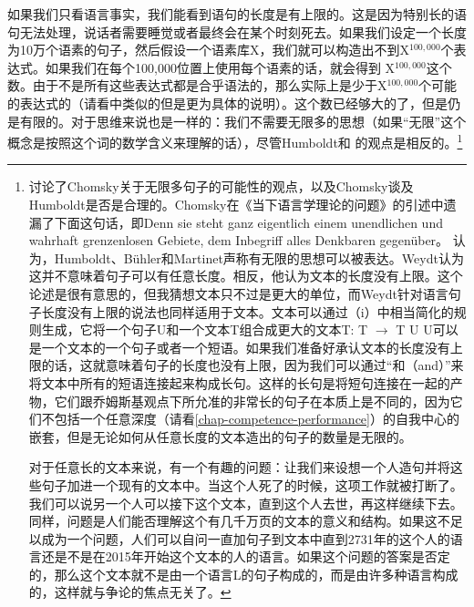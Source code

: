 \noindent
如果我们只看语言事实，我们能看到语句的长度是有上限的。这是因为特别长的语句无法处理，说话者需要睡觉或者最终会在某个时刻死去。如果我们设定一个长度为10万个语素的句子，然后假设一个语素库X，我们就可以构造出不到X$^{100,000}$个表达式。如果我们在每个100,000位置上使用每个语素的话，就会得到 X$^{100,000}$这个数。由于不是所有这些表达式都是合乎语法的，那么实际上是少于X$^{100,000}$个可能的表达式的（请看\citealp{Weydt72a}中类似的但是更为具体的说明）。这个数已经够大的了，但是仍是有限的。对于思维来说也是一样的：我们不需要无限多的思想（如果“无限”这个概念是按照这个词的数学含义来理解的话），尽管Humboldt和 \citet[]{Chomsky2008a}的观点是相反的。\footnote{%
 \citet{Weydt72a}讨论了Chomsky关于无限多句子的可能性的观点，以及Chomsky谈及Humboldt是否是合理的。Chomsky在《当下语言学理论的问题》\citep[]{Chomsky70b-ut}的引述中遗漏了下面这句话，即Denn sie steht ganz eigentlich einem unendlichen und
    wahrhaft grenzenlosen Gebiete, dem Inbegriff alles Denkbaren gegenüber。 \citet[]{Weydt72a}认为，Humboldt、Bühler和Martinet声称有无限的思想可以被表达。Weydt认为这并不意味着句子可以有任意长度。相反，他认为文本的长度没有上限。这个论述是很有意思的，但我猜想文本只不过是更大的单位，而Weydt针对语言句子长度没有上限的说法也同样适用于文本。文本可以通过（i）中相当简化的规则生成，它将一个句子U和一个文本T组合成更大的文本T:
  \ea
  T $\to$ T U
  \z
U可以是一个文本的一个句子或者一个短语。如果我们准备好承认文本的长度没有上限的话，这就意味着句子的长度也没有上限，因为我们可以通过“和（and）”来将文本中所有的短语连接起来构成长句。这样的长句是将短句连接在一起的产物，它们跟乔姆斯基观点下所允准的非常长的句子在本质上是不同的，因为它们不包括一个任意深度（请看\ref{chap-competence-performance}）的自我中心的嵌套，但是无论如何从任意长度的文本造出的句子的数量是无限的。

对于任意长的文本来说，有一个有趣的问题：让我们来设想一个人造句并将这些句子加进一个现有的文本中。当这个人死了的时候，这项工作就被打断了。我们可以说另一个人可以接下这个文本，直到这个人去世，再这样继续下去。同样，问题是人们能否理解这个有几千万页的文本的意义和结构。如果这不足以成为一个问题，人们可以自问一直加句子到文本中直到2731年的这个人的语言还是不是在2015年开始这个文本的人的语言。如果这个问题的答案是否定的，那么这个文本就不是由一个语言L的句子构成的，而是由许多种语言构成的，这样就与争论的焦点无关了。
} 
